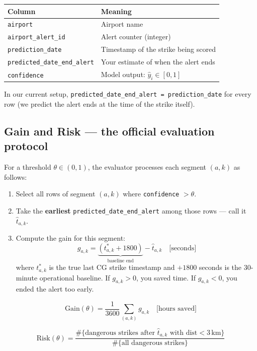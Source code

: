 \documentclass[12pt,a4paper]{article}
\begin{document}
\begin{center}
\begin{tabular}{L{4.5cm} L{8cm}}
\toprule
\textbf{Column} & \textbf{Meaning} \\
\midrule
\texttt{airport} & Airport name \\
\texttt{airport\_alert\_id} & Alert counter (integer) \\
\texttt{prediction\_date} & Timestamp of the strike being scored \\
\texttt{predicted\_date\_end\_alert} & Your estimate of when the alert ends \\
\texttt{confidence} & Model output: $\hat{y}_i \in [0,1]$ \\
\bottomrule
\end{tabular}
\end{center}

In our current setup, \texttt{predicted\_date\_end\_alert = prediction\_date} for every row (we predict the alert ends at the time of the strike itself).

\subsection{Gain and Risk --- the official evaluation protocol}

For a threshold $\theta \in (0,1)$, the evaluator processes each segment $(a, k)$ as follows:

\begin{enumerate}
  \item Select all rows of segment $(a,k)$ where \texttt{confidence} $> \theta$.
  \item Take the \textbf{earliest} \texttt{predicted\_date\_end\_alert} among those rows --- call it $\hat{t}_{a,k}$.
  \item Compute the gain for this segment:
    \[
      g_{a,k} = \underbrace{(t^*_{a,k} + 1800)}_{\text{baseline end}} - \hat{t}_{a,k}
      \quad \text{[seconds]}
    \]
    where $t^*_{a,k}$ is the true last CG strike timestamp and $+1800$ seconds is the 30-minute operational baseline. If $g_{a,k} > 0$, you saved time. If $g_{a,k} < 0$, you ended the alert too early.
\end{enumerate}

\[
  \text{Gain}(\theta) = \frac{1}{3600} \sum_{(a,k)} g_{a,k}
  \quad \text{[hours saved]}
\]

\[
  \text{Risk}(\theta) = \frac{\#\{\text{dangerous strikes after } \hat{t}_{a,k} \text{ with dist} < 3\,\text{km}\}}{\#\{\text{all dangerous strikes}\}}
\]
\end{document}
